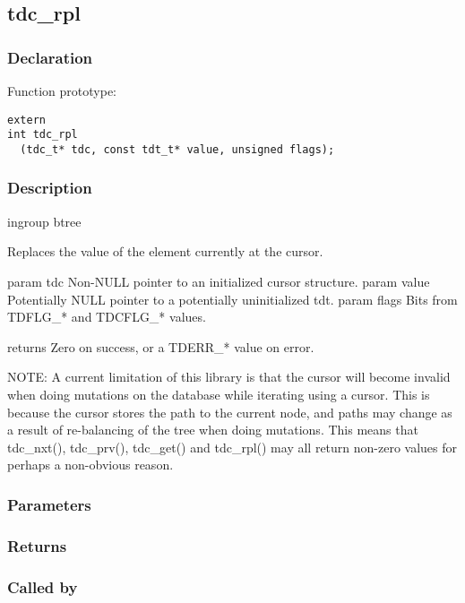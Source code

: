 
\newpage
\subsection{tdc\_rpl}
\subsubsection{Declaration} Function prototype:

\begin{verbatim}
extern
int tdc_rpl
  (tdc_t* tdc, const tdt_t* value, unsigned flags);
\end{verbatim}

\subsubsection{Description}


 ingroup btree

 Replaces the value of the element currently at the cursor.

 param tdc Non-NULL pointer to an initialized cursor structure.
 param value Potentially NULL pointer to a potentially uninitialized tdt.
 param flags Bits from TDFLG\_* and TDCFLG\_* values.

 returns Zero on success, or a TDERR\_* value on error.

 NOTE: A current limitation of this library is that the cursor will
 become invalid when doing mutations on the database while iterating
 using a cursor. This is because the cursor stores the path to the
 current node, and paths may change as a result of re-balancing of
 the tree when doing mutations. This means that tdc\_nxt(), tdc\_prv(),
 tdc\_get() and tdc\_rpl() may all return non-zero values for perhaps
 a non-obvious reason.

 

\subsubsection{Parameters}
\subsubsection{Returns}
\subsubsection{Called by}
